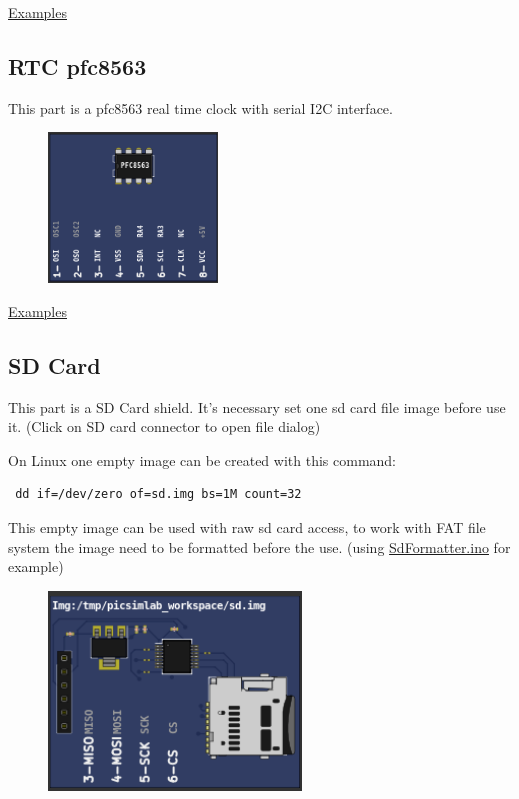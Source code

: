 \href{https://lcgamboa.github.io/picsimlab_examples/examples/examples_index.html\#RTC\_ds1307}{Examples}


\subsection{RTC pfc8563}

This part is a pfc8563 real time clock with serial I2C interface.

\begin{figure}[H]
\center
\includegraphics[width=0.4\textwidth]{img/part_pcf8563.png} 
\end{figure}

\href{https://lcgamboa.github.io/picsimlab_examples/examples/examples_index.html\#RTC\_pfc8563}{Examples}


\subsection{SD Card}

This part is a SD Card shield. It's necessary set one sd card file image before use it. (Click on SD card connector to open file dialog)

On Linux one empty image can be created with this command: 
\begin{verbatim}
 dd if=/dev/zero of=sd.img bs=1M count=32
\end{verbatim}
This empty image can be used with raw sd card access, to work with FAT file system  the image need to be formatted before the use. (using \href{https://github.com/greiman/SdFat/blob/master/examples/SdFormatter/SdFormatter.ino}{SdFormatter.ino} for example) 

\begin{figure}[H]
\center
\includegraphics[width=0.6\textwidth]{img/part_sdcard.png} 
\end{figure} 


